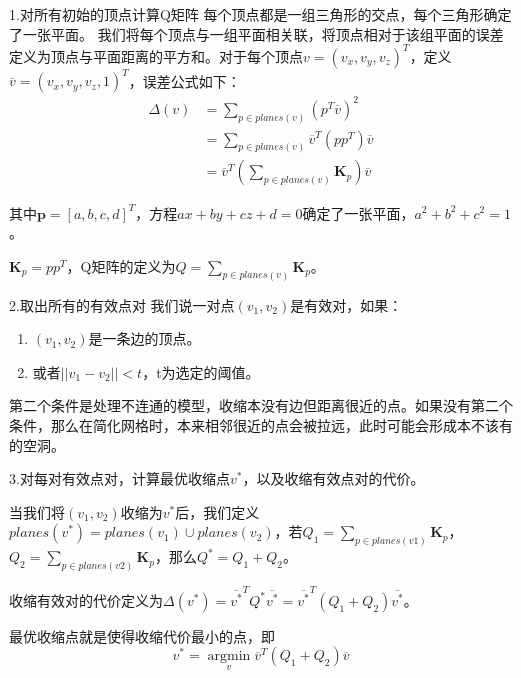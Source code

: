 \documentclass[10.5pt]{beamer}
\begin{document}
\begin{frame}{1.对所有初始的顶点计算Q矩阵}
每个顶点都是一组三角形的交点，每个三角形确定了一张平面。 我们将每个顶点与一组平面相关联，将顶点相对于该组平面的误差定义为顶点与平面距离的平方和。对于每个顶点$v = (v_{x},v_{y},v_{z})^{T}$，定义$\overline{v} = (v_{x},v_{y},v_{z},1)^{T}$，误差公式如下：
\begin{equation}
\begin{aligned}
\Delta(v) 
&= \sum_{p \in planes(v)} (p^{T}\overline{v})^{2} \\
&= \sum_{p \in planes(v)} \overline{v}^{T} (p p^{T}) \overline{v} \\
&= \overline{v}^{T} (\sum_{p \in planes(v)} \mathbf{K}_{p}) \overline{v}
\end{aligned}
\end{equation}

其中$\mathbf{p} = [a,b,c,d]^{T}$，方程$ax+by+cz+d = 0$确定了一张平面，$a^2 + b^2 + c^2  = 1$。

$\mathbf{K}_{p} = p p^{T}$，Q矩阵的定义为$Q = \sum_{p \in planes(v)} \mathbf{K}_{p}$。

\end{frame}


\begin{frame}{2.取出所有的有效点对}
我们说一对点$(v_{1},v_{2})$是有效对，如果：
\begin{enumerate}
\item $(v_{1},v_{2})$是一条边的顶点。
\item 或者$||v_{1} - v_{2} || < t$，t为选定的阈值。
\end{enumerate}

第二个条件是处理不连通的模型，收缩本没有边但距离很近的点。如果没有第二个条件，那么在简化网格时，本来相邻很近的点会被拉远，此时可能会形成本不该有的空洞。

\end{frame}

\begin{frame}{3.对每对有效点对，计算最优收缩点$v^{*}$，以及收缩有效点对的代价。}

当我们将$(v_{1},v_{2})$收缩为$v^{*}$后，我们定义$planes(v^{*}) = planes(v_{1}) \cup planes(v_{2})$，若$Q_{1} = \sum_{p \in planes(v1)} \mathbf{K}_{p}$，$Q_{2} = \sum_{p \in planes(v2)} \mathbf{K}_{p}$，那么$Q^{*} = Q_{1} + Q_{2}$。

收缩有效对的代价定义为$\Delta(v^{*}) = \overline{v^{*}}^{T} Q^{*} \overline{v^{*}} =  \overline{v^{*}}^{T} (Q_{1} + Q_{2}) \overline{v^{*}}$。

最优收缩点就是使得收缩代价最小的点，即
$$v^{*}= \mathop{\arg\min}\limits_{v} \overline{v}^{T} (Q_{1} + Q_{2}) \overline{v}$$


\end{frame}
\end{document}

